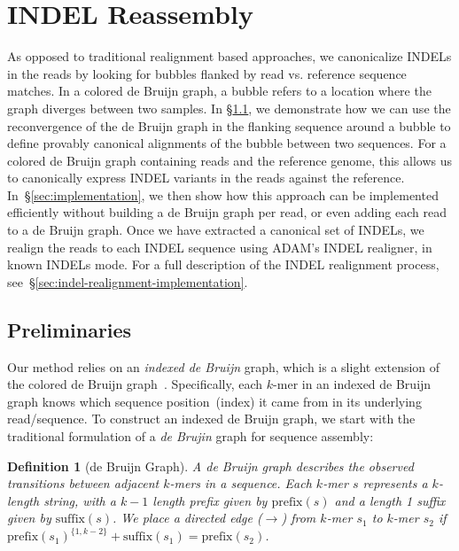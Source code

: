 \documentclass[phd]{ucbthesis}
\newtheorem{defn}{Definition}
\begin{document}
\section{INDEL Reassembly}
\label{sec:indel-reassembly}

As opposed to traditional realignment based approaches, we canonicalize INDELs
in the reads by looking for bubbles flanked by read vs. reference sequence matches. In a colored de Bruijn
graph, a bubble refers to a location where the graph diverges between two
samples. In \S\ref{sec:formulation}, we demonstrate how we can use the
reconvergence of the de Bruijn graph in the flanking sequence around a bubble
to define provably canonical alignments of the bubble between two sequences.
For a colored de Bruijn graph containing reads and the reference genome, this
allows us to canonically express INDEL variants in the reads against the
reference. In~\S\ref{sec:implementation}, we then show how this approach
can be implemented efficiently without building a de Bruijn graph per read,
or even adding each read to a de Bruijn graph. Once we have extracted a
canonical set of INDELs, we realign the reads to each INDEL sequence using
\textsc{ADAM}'s INDEL realigner, in known INDELs mode. For a full description
of the INDEL realignment process, see~\S\ref{sec:indel-realignment-implementation}.

\subsection{Preliminaries}
\label{sec:formulation}

Our method relies on an \emph{indexed de Bruijn} graph, which is a slight
extension of the colored de Bruijn graph~\cite{iqbal12}. Specifically, each
$k$-mer in an indexed de Bruijn graph knows which sequence position~(index)
it came from in its underlying read/sequence. To construct an indexed de
Bruijn graph, we start with the traditional formulation of a \emph{de Brujin}
graph for sequence assembly:

\begin{defn}[de Bruijn Graph]
\label{defn:dbg}
A de Bruijn graph describes the observed transitions between adjacent $k$-mers in a sequence. Each
$k$-mer $s$ represents a $k$-length string, with a $k - 1$ length prefix given by $\text{prefix}(s)$ and a
length 1 suffix given by $\text{suffix}(s)$. We place a directed edge ($\rightarrow$) from $k$-mer $s_1$ to
$k$-mer $s_2$ if $\text{prefix}(s_1)^{\{1, k - 2\}} + \text{suffix}(s_1) = \text{prefix}(s_2)$.
\end{defn}
\end{document}
